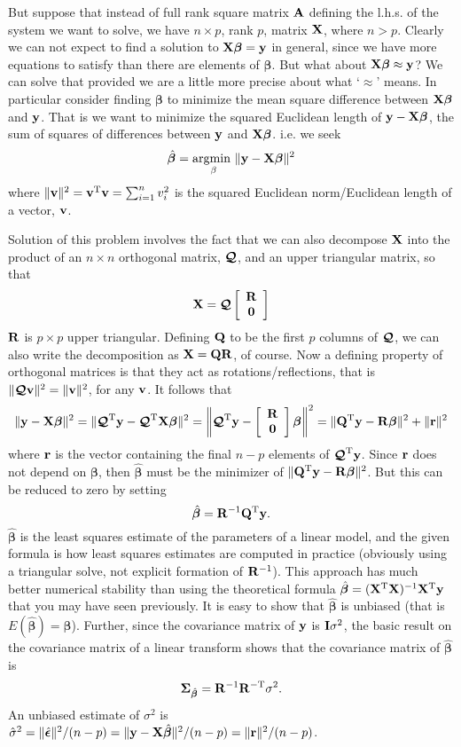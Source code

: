 \documentclass[10pt] {article}
\newcommand{\bp}{{\vm \beta}}
\newcommand{\X}{{\vf X}}
\newcommand{\vf}{\bf} %
\newcommand{\vm}{\bm} %
\newcommand{\ts}{^{\rm T}}
\newcommand{\its}{^{-\rm T}}
\newcommand{\bmat}[1]{\left [ \begin{array}{#1}}
\newcommand{\emat}{\end{array}\right ]}
\theoremstyle{definition}
\begin{document}
But suppose that instead of full rank square matrix $\bf A$ defining the l.h.s. of the system we want to solve, we have $n \times p$, rank $p$, matrix $\X$, where $n > p$. Clearly we can not expect to find a solution to $\X\bp={\bf y}$ in general, since we have more equations to satisfy than there are elements of $\bp$. But what about $\X\bp \approx {\bf y}$? We can solve that provided we are a little more precise about what `$\approx$' means. In particular consider finding $\bp$ to minimize the  mean square difference between $\X\bp$ and $\bf y$. That is we want to minimize the squared Euclidean length of ${\bf y} - \X \bp$, the sum of squares of differences between ${\bf y} $ and $\X \bp$. i.e. we seek
$$
\hat \bp = \underset{\beta}{\text{argmin }} \|{\bf y} - \X \bp \|^2
$$
where $\|{\bf v}\|^2 = {\bf v}\ts{\bf v} = \sum_{i=1}^n v_i^2$ is the squared Euclidean norm/Euclidean length of a vector, $\bf v$. 

Solution of this problem involves the fact that we can also decompose $\bf X$ into the product of an $n \times n$ orthogonal matrix, $\bm{{\cal Q}}$, and an upper triangular matrix, so that
$$
{\bf X} = \bm{{\cal Q}} \bmat{c} {\bf R} \\ {\bf 0} \emat
$$ 
${\bf R}$ is $p \times p$ upper triangular. Defining $\bf Q$ to be the first $p$ columns of $\bm{{\cal Q}}$, we can also write the decomposition as $\X = {\bf QR}$, of course. Now a defining property of orthogonal matrices is that they act as rotations/reflections, that is $\|\bm{{\cal Q}} {\bf v}\|^2 = \|{\bf v}\|^2 $, for any ${\bf v}$. It follows that 
$$
\|{\bf y} - \X \bp \|^2 = \|\bm{{\cal Q}}\ts{\bf y} - \bm{{\cal Q}}\ts\X \bp \|^2 = \left \|\bm{{\cal Q}}\ts{\bf y} -  \bmat{c} {\bf R} \\ {\bf 0} \emat \bp  \right \|^2 = \|{\bf Q}\ts {\bf y} - {\bf R}\bp \|^2 + \|{\bf r}\|^2
$$
where $\bf r$ is the vector containing the final $n-p $ elements of $\bm{{\cal Q}}\ts{\bf y}$. Since $\bf r$ does not depend on $\bp$, then $\hat \bp$ must be the minimizer of  $\|{\bf Q}\ts {\bf y} - {\bf R}\bp \|^2$. But this can be reduced to zero by setting 
$$
\hat \bp = {\bf R}^{-1} {\bf Q}\ts {\bf y}.
$$
$\hat \bp$ is the least squares estimate of the parameters of a linear model, and the given formula is how least squares estimates are computed in practice (obviously using a triangular solve, not explicit formation of ${\bf R}^{-1}$). This approach has much better numerical stability than using the theoretical formula $\hat \bp = (\X\ts \X)^{-1} \X \ts {\bf y}$ that you may have seen previously. It is easy to show that $\hat \bp$ is unbiased (that is $E(\hat \bp) = \bp$). Further, since the covariance matrix of $\bf y$ is ${\bf I}\sigma^2$, the basic result on the covariance matrix of a linear transform shows that the covariance matrix of $\hat \bp$ is 
$$
{\bf \Sigma}_{\hat \bp} = {{\bf R}^{-1}{\bf R}\its} \sigma^2. 
$$ 
An unbiased estimate of $\sigma^2$ is $\hat \sigma^2 = \|\hat {\bm \epsilon}\|^2/(n-p) = \|{\bf y} - \X \hat \bp \|^2/(n-p) = \|{\bf r}\|^2/(n-p)$.
\end{document}
